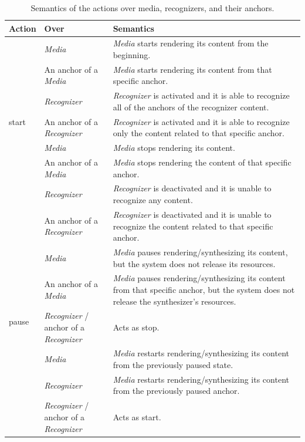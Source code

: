 \begin{table}[H]
\scriptsize
\def\arraystretch{1.5}
\begin{tabular}[!ht]{ m{1cm} m{4.5cm} m{7cm} }
	\hline
	\textbf{Action} & \textbf{Over}
		& \textbf{Semantics} \\

	\hline
	\multirow{7}{*}{start}
	& \textit{Media} &\textit{Media} starts rendering its content from the beginning.\\
	\cline{2-3}
	& An anchor of a \textit{Media} &	\textit{Media} starts rendering its
	content from that specific anchor. \\
	\cline{2-3}
	& \textit{Recognizer} &	\textit{Recognizer} is activated and it is able to
	recognize all of the anchors of the recognizer content. \\
	\cline{2-3}
	& An anchor of a \textit{Recognizer} &	\textit{Recognizer} is activated
	and it is able to recognize only the content related to that specific
	anchor. \\
	\hline

	\multirow{6}{*}{stop}
	& \textit{Media} & \textit{Media} stops rendering its content.\\
	\cline{2-3}
	& An anchor of a \textit{Media} &	\textit{Media} stops rendering the
	content of that specific anchor. \\
	\cline{2-3}
	& \textit{Recognizer} &	\textit{Recognizer} is deactivated and it is unable
	to recognize any content. \\
	\cline{2-3}
	& An anchor of a \textit{Recognizer} &	\textit{Recognizer} is deactivated
	and it is unable to recognize the content related to that specific anchor.\\
	\hline

	\multirow{5}{*}{pause}
	& \textit{Media} &	\textit{Media} pauses rendering/synthesizing its
	content, but
	the system does not release its resources.\\
	\cline{2-3}
	& An anchor of a \textit{Media} &	\textit{Media} pauses
	rendering/synthesizing its
	content from that specific anchor, but the system does not release the
	synthesizer’s resources. \\
	\cline{2-3}
	& \textit{Recognizer} / anchor of a \textit{Recognizer} &	Acts as stop. \\
	\hline

	\multirow{5}{*}{resume}
	& \textit{Media} &	\textit{Media} restarts rendering/synthesizing its
	content from
	the previously paused state. \\
	\cline{2-3}
	& \textit{Recognizer} &	\textit{Media} restarts rendering/synthesizing its
	content
	from the previously paused anchor. \\
	\cline{2-3}
	& \textit{Recognizer} / anchor of a \textit{Recognizer} &	Acts as start. \\
	\hline
\end{tabular}
\caption{Semantics of the actions over media, recognizers, and their anchors.}
\label{table:relationship}
\end{table}

